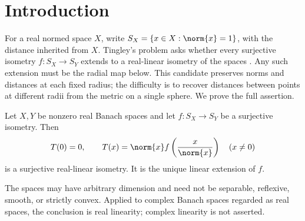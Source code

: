 \begin{abstract}
Every surjective isometry between the unit spheres of real Banach spaces extends uniquely to a surjective real-linear isometry, giving an affirmative solution to Tingley's problem. If distances between different radii are not preserved, we realize the positive maximal defect in a possibly enlarged pair of Banach spaces. We then align extremal chords using common supports and Darbo's fixed-point theorem and obtain a contradiction from support and convexity estimates.
\end{abstract}

\section{Introduction}\label{sec:intro}

For a real normed space $X$, write $S_X=\{x\in X:\norm{x}=1\}$, with the distance inherited from $X$. Tingley's problem asks whether every surjective isometry $f:S_X\to S_Y$ extends to a real-linear isometry of the spaces \cite{Tingley1987}. Any such extension must be the radial map below. This candidate preserves norms and distances at each fixed radius; the difficulty is to recover distances between points at different radii from the metric on a single sphere. We prove the full assertion.

\begin{theorem}\label{thm:main}
Let $X,Y$ be nonzero real Banach spaces and let $f:S_X\to S_Y$ be a surjective isometry. Then
\[
T(0)=0,\qquad T(x)=\norm{x}f\left(\frac{x}{\norm{x}}\right)\quad(x\ne0)
\]
is a surjective real-linear isometry. It is the unique linear extension of $f$.
\end{theorem}

The spaces may have arbitrary dimension and need not be separable, reflexive, smooth, or strictly convex. Applied to complex Banach spaces regarded as real spaces, the conclusion is real linearity; complex linearity is not asserted.
